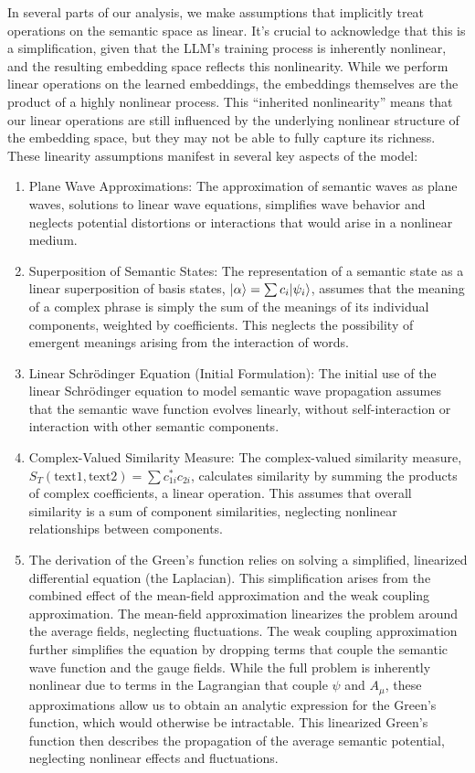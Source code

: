 \documentclass[prd,amsmath,amssymb,12pt]{revtex4}
\DeclarePairedDelimiter\ket{\lvert}{\rangle}
\begin{document}
In several parts of our analysis, we make assumptions that implicitly
treat operations on the semantic space as linear. It's crucial to acknowledge
that this is a simplification, given that the LLM's training process is
inherently nonlinear, and the resulting embedding space reflects this
nonlinearity. While we perform linear operations on the learned embeddings,
the embeddings themselves are the product of a highly nonlinear process.
This ``inherited nonlinearity'' means that our linear operations are still
influenced by the underlying nonlinear structure of the embedding space,
but they may not be able to fully capture its richness. These linearity
assumptions manifest in several key aspects of the model:

\begin{enumerate}
    \item Plane Wave Approximations: The approximation of semantic waves as
    plane waves, solutions to linear wave equations, simplifies wave behavior
    and neglects potential distortions or interactions that would arise in
    a nonlinear medium.
    \item Superposition of Semantic States: The representation of a semantic
    state as a linear superposition of basis states, $\ket{\alpha} = \sum
    c_i\ket{\psi_i}$, assumes that the meaning of a complex phrase is simply
    the sum of the meanings of its individual components, weighted by coefficients.
    This neglects the possibility of emergent meanings arising from the interaction
    of words.
    \item Linear Schrödinger Equation (Initial Formulation): The initial
    use of the linear Schrödinger equation to model semantic wave propagation
    assumes that the semantic wave function evolves linearly, without
    self-interaction or interaction with other semantic components.
    \item Complex-Valued Similarity Measure: The complex-valued similarity
    measure, $S_T(\text{text1},\text{text2}) = \sum c_{1i}^* c_{2i}$,
    calculates similarity by summing the products of complex coefficients,
    a linear operation. This assumes that overall similarity is a sum of
    component similarities, neglecting nonlinear relationships between components.
    \item The derivation of the Green's function relies on solving a simplified,
    linearized differential equation (the Laplacian). This simplification
    arises from the combined effect of the mean-field approximation and the
    weak coupling approximation. The mean-field approximation linearizes the
    problem around the average fields, neglecting fluctuations. The weak
    coupling approximation further simplifies the equation by dropping terms
    that couple the semantic wave function and the gauge fields. While the
    full problem is inherently nonlinear due to terms in the Lagrangian that
    couple $\psi$ and $A_\mu$, these approximations allow us to obtain an
    analytic expression for the Green's function, which would otherwise be
    intractable. This linearized Green's function then describes the propagation
    of the average semantic potential, neglecting nonlinear effects and fluctuations.
 \end{enumerate}
\end{document}
